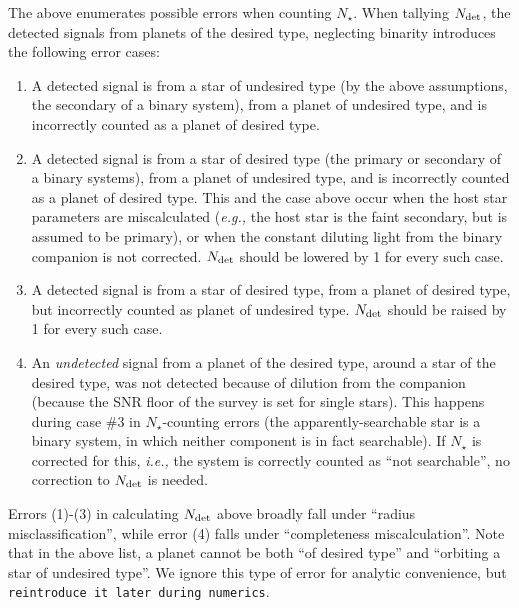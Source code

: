 \documentclass{emulateapj}
\begin{document}
The above enumerates possible errors when counting $N_\star$.
When tallying $N_{\rm det}$, the detected signals from planets of the desired 
type, neglecting binarity introduces the following error cases:
\begin{enumerate}
\item 
A detected signal is from a star of undesired type (by the above assumptions, 
the secondary of a binary system), from a planet of undesired type, and is 
incorrectly counted as a planet of desired type.
%
\item
A detected signal is from a star of desired type (the primary or secondary of 
a binary systems), from a planet of undesired type, and is incorrectly counted 
as a planet of desired type.
This and the case above occur when the host star parameters are miscalculated 
({\it e.g.,} the host star is the faint secondary, but is assumed to be 
primary), or when the constant diluting light from the binary companion is not 
corrected.
$N_{\rm det}$ should be lowered by 1 for every such case.
%
\item
A detected signal is from a star of desired type, from a planet of desired 
type, but incorrectly counted as planet of undesired type.
$N_{\rm det}$ should be raised by 1 for every such case.
\item
An {\it undetected} signal from a planet of the desired type, around a star of 
the desired type, was not detected because of dilution from the companion 
(because the SNR floor of the survey is set for single stars). 
This happens during case \#3 in $N_\star$-counting errors (the 
apparently-searchable star is a binary system, in which neither component is 
in fact searchable). If $N_\star$ is corrected for this, {\it i.e.,} the 
system is correctly counted as ``not searchable'', no correction to $N_{\rm 
det}$ is needed.
\end{enumerate}

Errors (1)-(3) in calculating $N_{\rm det}$ above broadly fall under ``radius 
misclassification'', while error (4) falls under ``completeness 
miscalculation''.
Note that in the above list, a planet cannot be both ``of desired type'' and 
``orbiting a star of undesired type''. We ignore this type of error for 
analytic convenience, but \texttt{reintroduce it later during numerics}.
\end{document}
